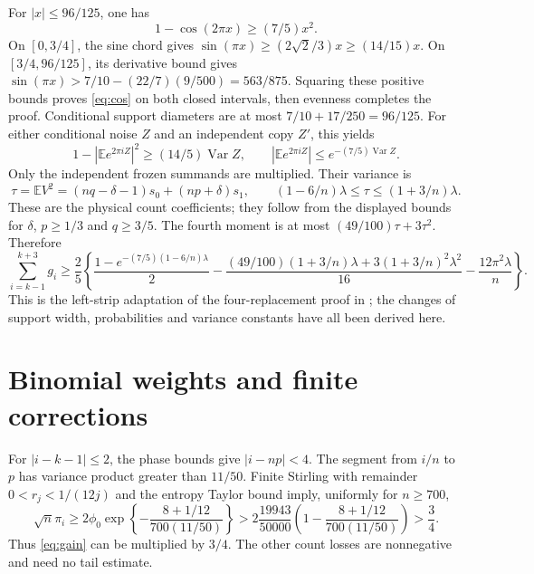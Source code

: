 \documentclass[11pt]{article}
\newcommand{\E}{\mathbb E}\newcommand{\Pp}{\mathbb P}
\begin{document}
For $|x|\le96/125$, one has
\begin{equation}\label{eq:cos}1-\cos(2\pi x)\ge(7/5)x^2.
\end{equation}
On $[0,3/4]$, the sine chord gives
$\sin(\pi x)\ge(2\sqrt2/3)x\ge(14/15)x$.
On $[3/4,96/125]$, its derivative bound gives
$\sin(\pi x)>7/10-(22/7)(9/500)=563/875$.
Squaring these positive bounds proves \eqref{eq:cos} on both closed
intervals, then evenness completes the proof.
Conditional support diameters are at most $7/10+17/250=96/125$.
For either conditional noise $Z$ and an independent copy $Z'$, this yields
\[
 1-|\E e^{2\pi iZ}|^2\ge(14/5)\operatorname{Var}Z,
 \qquad |\E e^{2\pi iZ}|\le e^{-(7/5)\operatorname{Var}Z}.
\]
Only the independent frozen summands are multiplied. Their variance is
\[
 \tau=\E V^2=(nq-\delta-1)s_0+(np+\delta)s_1,
 \qquad(1-6/n)\lambda\le\tau\le(1+3/n)\lambda.
\]
These are the physical count coefficients; they follow from the displayed
bounds for $\delta$, $p\ge1/3$ and $q\ge3/5$.
The fourth moment is at most $(49/100)\tau+3\tau^2$. Therefore
\begin{equation}\label{eq:gain}
 \sum_{i=k-1}^{k+3}g_i\ge\frac25\left\{
 \frac{1-e^{-(7/5)(1-6/n)\lambda}}2
 -\frac{(49/100)(1+3/n)\lambda+3(1+3/n)^2\lambda^2}{16}
 -\frac{12\pi^2\lambda}{n}\right\}.
\end{equation}
This is the left-strip adaptation of the four-replacement proof in
; the changes of support width, probabilities and
variance constants have all been derived here.

\section{Binomial weights and finite corrections}
For $|i-k-1|\le2$, the phase bounds give $|i-np|<4$.
The segment from $i/n$ to $p$ has variance product greater than $11/50$.
Finite Stirling with remainder $0<r_j<1/(12j)$ and the entropy Taylor
bound imply, uniformly for $n\ge700$,
\[
 \sqrt n\pi_i\ge2\phi_0
 \exp\left\{-\frac{8+1/12}{700(11/50)}\right\}
 >2\frac{19943}{50000}
       \left(1-\frac{8+1/12}{700(11/50)}\right)>\frac34.
\]
Thus \eqref{eq:gain} can be multiplied by $3/4$. The other count losses
are nonnegative and need no tail estimate.
\end{document}
